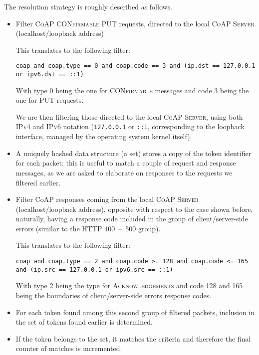 \documentclass[a4paper,11pt]{article} %
\begin{document}
    \medskip

    The resolution strategy is roughly described as follows.

    \begin{itemize}
        \item Filter \textsc{CoAP CONfirmable PUT} requests, directed to the local \textsc{CoAP Server} (localhost/loopback address)

        This translates to the following filter:

        \texttt{coap and coap.type == 0 and coap.code == 3 and (ip.dst == 127.0.0.1 or ipv6.dst == ::1)}

        With type 0 being the one for \textsc{CONfirmable} messages and code 3 being the one for \textsc{PUT} requests.

        We are then filtering those directed to the local \textsc{CoAP Server}, using both \textsc{IPv4} and \textsc{IPv6} notation (\texttt{127.0.0.1} or \texttt{::1}, corresponding to the loopback interface, managed by the operating system kernel itself).
        \item A uniquely hashed data structure (a set) stores a copy of the token identifier for each packet: this is useful to match a couple of request and response messages, as we are asked to elaborate on responses to the requests we filtered earlier.
        \item Filter CoAP responses coming from the local \textsc{CoAP Server} (localhost/loopback address), opposite with respect to the case shown before, naturally, having a response code included in the group of client/server-side errors (similar to the HTTP 400\ --\ 500 group).

        This translates to the following filter:

        \texttt{coap and coap.type == 2 and coap.code >= 128 and coap.code <= 165 and (ip.src == 127.0.0.1 or ipv6.src == ::1)}

        With type 2 being the type for \textsc{Acknowledgements} and code 128 and 165 being the boundaries of client/server-side errors response codes.
        \item For each token found among this second group of filtered packets, inclusion in the set of tokens found earlier is determined.
        \item If the token belongs to the set, it matches the criteria and therefore the final counter of matches is incremented.
    \end{itemize}
\end{document}
